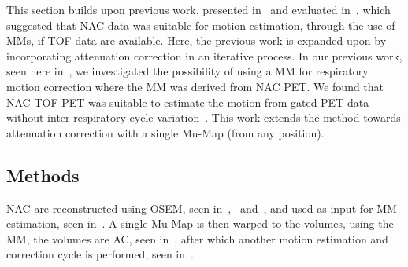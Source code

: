             This section builds upon previous work, presented in~ and evaluated in~, which suggested that \gls{NAC} data was suitable for motion estimation, through the use of \glspl{MM}, if \gls{TOF} data are available. Here, the previous work is expanded upon by incorporating attenuation correction in an iterative process. In our previous work, seen here in~, we investigated the possibility of using a \gls{MM} for respiratory motion correction where the \gls{MM} was derived from \gls{NAC} \gls{PET}. We found that \gls{NAC} \gls{TOF} \gls{PET} was suitable to estimate the motion from gated \gls{PET} data without inter-respiratory cycle variation~\parencite{Whitehead2019ImpactPET}. This work extends the method towards attenuation correction with a single \gls{Mu-Map} (from any position).
        
        \subsection{Methods} \label{sec:pet_ct_respiratory_motion_correction_with_a_single_attenuation_map_using_nAC_derived_deformation_fields_methods}
            \gls{NAC} are reconstructed using \gls{OSEM}, seen in~,~ and~, and used as input for \gls{MM} estimation, seen in~. A single \gls{Mu-Map} is then warped to the volumes, using the \gls{MM}, the volumes are \gls{AC}, seen in~, after which another motion estimation and correction cycle is performed, seen in~.
            
